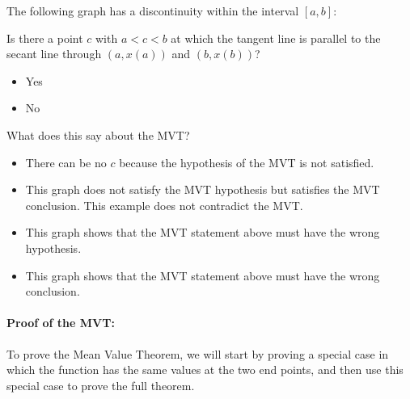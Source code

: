 \documentclass[pdftex, brazil, 12pt, twoside]{article}
\newcommand{\bolota}{\item[$\bigcirc$]}
\begin{document}
\begin{Exercise}[title={The logic of the MVT}]
  \noindent The following graph has a discontinuity within the interval $[a, b]$:
  \begin{figure}[H]
    \begin{center}
      \label{fig:mvt-stat-2}
    \end{center}
  \end{figure}
  \noindent Is there a point $c$ with $a < c < b$ at which the tangent line is
  parallel to the secant line through $(a, x(a))$ and $(b, x(b))$?
  \begin{itemize}[noitemsep]
    \bolota Yes
    \bolota No
  \end{itemize}
  \noindent What does this say about the MVT?
  \begin{itemize}[noitemsep]
    \bolota There can be no $c$ because the hypothesis of the MVT is not satisfied.
    \bolota This graph does not satisfy the MVT hypothesis but satisfies the MVT
    conclusion. This example does not contradict the MVT.
    \bolota This graph shows that the MVT statement above must have the wrong hypothesis.
    \bolota This graph shows that the MVT statement above must have the wrong conclusion.
  \end{itemize}
\end{Exercise}

\paragraph{Proof of the MVT:} To prove the Mean Value Theorem, we will start by proving
a special case in which the function has the same values at the two end points,
and then use this special case to prove the full theorem.
\end{document}
